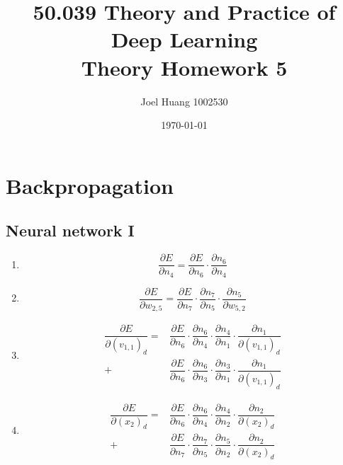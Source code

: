 \documentclass[twocolumn, 9pt]{article}
\title{
	50.039 Theory and Practice of Deep Learning\\
	Theory Homework 5
}
\author{Joel Huang 1002530}
\date{\today}
\newcommand{\del}{\partial}
\begin{document}
\maketitle

\section{Backpropagation}
\subsection*{Neural network I}
\begin{enumerate}
	\item
		\begin{equation*}
			\dfrac{\del E}{\del n_4} = \dfrac{\del E}{\del n_6} \cdot \dfrac{\del n_6}{\del n_4}
		\end{equation*}
	\item
		\begin{equation*}
			\dfrac{\del E}{\del w_{2,5}} = \dfrac{\del E}{\del n_7} \cdot \dfrac{\del n_7}{\del n_5} \cdot \dfrac{\del n_5}{\del w_{5,2}}
		\end{equation*}
	\item
		\begin{equation*}
		\begin{split}
			\dfrac{\del E}{\del (v_{1,1})_d} = &\dfrac{\del E}{\del n_6} \cdot \dfrac{\del n_6}{\del n_4} \cdot \dfrac{\del n_4}{\del n_1} \cdot \dfrac{\del n_1}{\del (v_{1,1})_d}\\
			+ &\dfrac{\del E}{\del n_6} \cdot \dfrac{\del n_6}{\del n_3} \cdot \dfrac{\del n_3}{\del n_1} \cdot \dfrac{\del n_1}{\del (v_{1,1})_d}
		\end{split}
		\end{equation*}
	\item
		\begin{equation*}
		\begin{split}
			\dfrac{\del E}{\del (x_2)_d} = &\dfrac{\del E}{\del n_6} \cdot \dfrac{\del n_6}{\del n_4} \cdot \dfrac{\del n_4}{\del n_2} \cdot \dfrac{\del n_2}{\del (x_2)_d}\\
			+ &\dfrac{\del E}{\del n_7} \cdot \dfrac{\del n_7}{\del n_5} \cdot \dfrac{\del n_5}{\del n_2} \cdot \dfrac{\del n_2}{\del (x_2)_d}
		\end{split}
		\end{equation*}
\end{enumerate}
\end{document}
